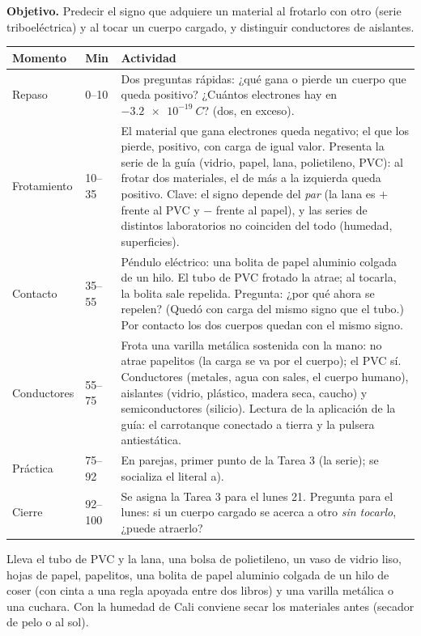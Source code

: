 \documentclass[11pt]{article}
\begin{document}

\textbf{Objetivo.} Predecir el signo que adquiere un material al frotarlo con otro (serie
triboeléctrica) y al tocar un cuerpo cargado, y distinguir conductores de aislantes.

\begin{center}
{\renewcommand{\arraystretch}{1.3}
\begin{tabularx}{\linewidth}{@{}l l X@{}}
  \toprule
  \textbf{Momento} & \textbf{Min} & \textbf{Actividad}\\
  \midrule
  Repaso & 0–10 & Dos preguntas rápidas: ¿qué gana o pierde un cuerpo que queda positivo?
    ¿Cuántos electrones hay en $\qty{-3,2e-19}{C}$? (dos, en exceso).\\
  Frotamiento & 10–35 & El material que gana electrones queda negativo; el que los pierde,
    positivo, con carga de igual valor. Presenta la serie de la guía (vidrio, papel, lana,
    polietileno, PVC): al frotar dos materiales, el de más a la izquierda queda positivo. Clave:
    el signo depende del \emph{par} (la lana es $+$ frente al PVC y $-$ frente al papel), y
    las series de distintos laboratorios no coinciden del todo (humedad, superficies).\\
  Contacto & 35–55 & Péndulo eléctrico: una bolita de papel aluminio colgada de un hilo. El
    tubo de PVC frotado la atrae; al tocarla, la bolita sale repelida. Pregunta: ¿por qué ahora
    se repelen? (Quedó con carga del mismo signo que el tubo.) Por contacto los dos cuerpos
    quedan con el mismo signo.\\
  Conductores & 55–75 & Frota una varilla metálica sostenida con la mano: no atrae papelitos
    (la carga se va por el cuerpo); el PVC sí. Conductores (metales, agua con sales, el
    cuerpo humano), aislantes (vidrio, plástico, madera seca, caucho) y semiconductores
    (silicio). Lectura de la aplicación de la guía: el carrotanque conectado a tierra y la
    pulsera antiestática.\\
  Práctica & 75–92 & En parejas, primer punto de la Tarea 3 (la serie); se socializa el
    literal a).\\
  Cierre & 92–100 & Se asigna la Tarea 3 para el lunes 21. Pregunta para el lunes: si un
    cuerpo cargado se acerca a otro \emph{sin tocarlo}, ¿puede atraerlo?\\
  \bottomrule
\end{tabularx}}
\end{center}

\begin{nota}
Lleva el tubo de PVC y la lana, una bolsa de polietileno, un vaso de vidrio liso, hojas de
papel, papelitos, una bolita de papel aluminio colgada de un hilo de coser (con cinta a una
regla apoyada entre dos libros) y una varilla metálica o una cuchara. Con la humedad de Cali
conviene secar los materiales antes (secador de pelo o al sol).
\end{nota}
\end{document}
